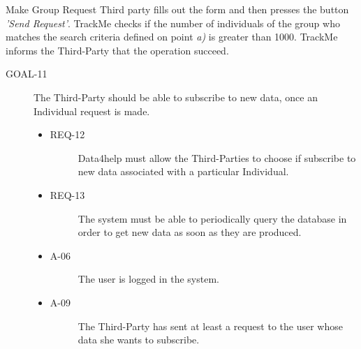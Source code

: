 \documentclass[a4paper]{article}
\newcommand{\requirement}{\ding{229}}%
\begin{document}
        \begin{usecase}{Make Group Request}
        {Third party fills out the form and then presses the button \textit{'Send Request'}.}
        {TrackMe checks if the number of individuals of the group who matches the search criteria defined on point \textit{a)} is greater than 1000.}
        {TrackMe informs the Third-Party that the operation succeed.}
        \end{usecase}
        
                \begin{description}
        	\item[GOAL-11] The Third-Party should be able to subscribe to new data, once an Individual request is made. 
            	\begin{itemize}
            	    \item[\requirement]
                	\begin{description}
                	\item[REQ-12] Data4help must allow the Third-Parties to choose if subscribe to new data associated with a particular Individual. 
                	\end{description}
                	\item[\requirement]
                	\begin{description}
                	\item[REQ-13] The system must be able to periodically query the database in order to get new data as soon as they are produced.
                	\end{description}
                	\item
                	\begin{description}
                	\item[A-06] The user is logged in the system.
                	\end{description}
                	\item
                	\begin{description}
                	\item[A-09] The Third-Party has sent at least a request to the user whose data she wants to subscribe.
                	\end{description}
                	\end{itemize}
        \end{description}
        
\end{document}
